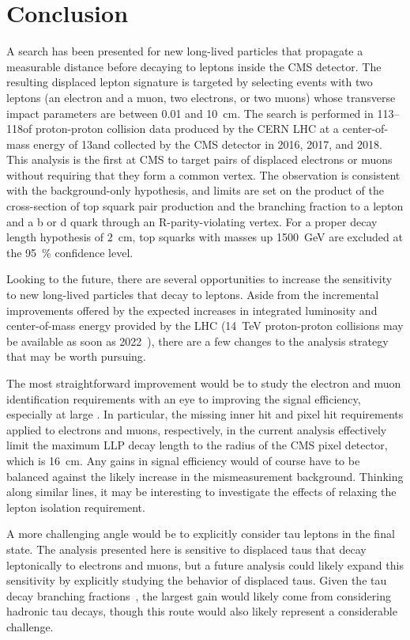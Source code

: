 \chapter{Conclusion}
\label{conclusion}
A search has been presented for new long-lived particles that propagate a measurable distance before decaying to leptons inside the CMS detector. The resulting displaced lepton signature is targeted by selecting events with two leptons (an electron and a muon, two electrons, or two muons) whose transverse impact parameters are between \num{0.01} and \SI{10}{\cm}. The search is performed in 113--118\fbinv of proton-proton collision data produced by the CERN LHC at a center-of-mass energy of 13\TeV and collected by the CMS detector in 2016, 2017, and 2018. This analysis is the first at CMS to target pairs of displaced electrons or muons without requiring that they form a common vertex. The observation is consistent with the background-only hypothesis, and limits are set on the product of the cross-section of top squark pair production and the branching fraction to a lepton and a b or d quark through an R-parity-violating vertex. For a proper decay length hypothesis of \SI{2}{\cm}, top squarks with masses up \SI{1500}{\GeV} are excluded at the \SI{95}{\percent} confidence level.

Looking to the future, there are several opportunities to increase the sensitivity to new long-lived particles that decay to leptons. Aside from the incremental improvements offered by the expected increases in integrated luminosity and center-of-mass energy provided by the LHC (\SI{14}{\TeV} proton-proton collisions may be available as soon as 2022~\cite{run3_constraints, lhc_schedule}), there are a few changes to the analysis strategy that may be worth pursuing.

The most straightforward improvement would be to study the electron and muon identification requirements with an eye to improving the signal efficiency, especially at large \ad. In particular, the missing inner hit and pixel hit requirements applied to electrons and muons, respectively, in the current analysis effectively limit the maximum LLP decay length to the radius of the CMS pixel detector, which is \SI{16}{\cm}. Any gains in signal efficiency would of course have to be balanced against the likely increase in the mismeasurement background. Thinking along similar lines, it may be interesting to investigate the effects of relaxing the lepton isolation requirement.

A more challenging angle would be to explicitly consider tau leptons in the final state. The analysis presented here is sensitive to displaced taus that decay leptonically to electrons and muons, but a future analysis could likely expand this sensitivity by explicitly studying the \ad behavior of displaced taus. Given the tau decay branching fractions~\cite{pdg_2020}, the largest gain would likely come from considering hadronic tau decays, though this route would also likely represent a considerable challenge.

